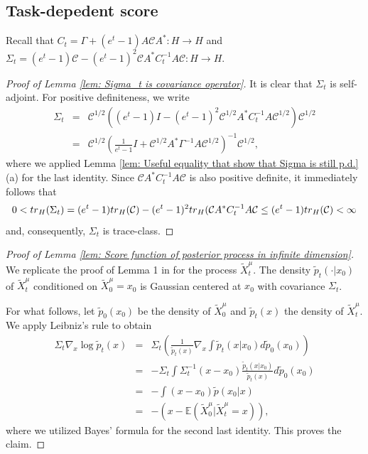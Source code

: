 \documentclass[10pt]{article} %
\newcommand{\E}{\mathbb{E}}
\theoremstyle{plain}
\theoremstyle{definition}
\theoremstyle{remark}
\newcommand{\tr}{{\rm tr}}
\newcommand{\C}{\mathcal C}
\begin{document}
\subsection{Task-depedent score} %

Recall that $C_t = \Gamma + (e^t -1 ) A \C A^* : H\to H$ and $\Sigma_t = (e^t -1)\C - (e^t-1)^2\C A^* C_t^{-1} A \C : H\to H$.

\begin{proof}[Proof of Lemma \ref{lem: Sigma_t is covariance operator}]
It is clear that $\Sigma_t$ is self-adjoint. For positive definiteness, we write
    \begin{eqnarray*}
        \Sigma_t 
        &=& \C^{1/2} \left((e^t-1)I - (e^t-1)^2  \C^{1/2} A^* C_t^{-1}A \C^{1/2}\right)  \C^{1/2} \\
        & = & \C^{1/2} \left( \frac{1}{e^t-1}I + \C^{1/2}A^* \Gamma^{-1}A \C^{1/2}\right)^{-1} \C^{1/2},
    \end{eqnarray*}
where we applied Lemma \ref{lem: Useful equality that show that Sigma is still p.d.} (a) for the last identity.
Since $\C A^* C_t^{-1} A \C$ is also positive definite, it immediately follows that
\begin{equation*}
    0<\tr_H(\Sigma_t) = (e^t-1) \tr_H(\C) - (e^t-1)^2 \tr_H(\C A^* C_t^{-1} A \C \leq (e^t-1) \tr_H(\C) < \infty
\end{equation*}
and, consequently, $\Sigma_t$ is trace-class.
\end{proof}

\begin{proof}[Proof of Lemma \ref{lem: Score function of posterior process in infinite dimension}] 
We replicate the proof of Lemma 1 in \citet{pidstrigach2023infinitedimensional} for the process $\widetilde{X}^{\mu}_t$.
The density $\tilde p_t(\cdot |x_0)$ of $\widetilde{X}^{\mu}_t $ conditioned on $\widetilde{X}^{\mu}_0 = x_0$ is Gaussian centered at $x_0$ with covariance $\Sigma_t$. 

For what follows, let $\tilde{p}_0(x_0)$ be the density of $\widetilde{X}_0^{\mu}$ and $\tilde p_t(x)$ the density of $\widetilde{X}^{\mu}_t$.
We apply Leibniz's rule to obtain
\begin{eqnarray*}
    \Sigma_t \nabla_x \log \tilde p_t(x) 
    &=&  \Sigma_t \left(\frac{1}{\tilde p_t(x)} \nabla_x \int \tilde p_t(x|x_0) d \tilde p_0(x_0)\right) \\
    & = &-\Sigma_t  \int \Sigma_t^{-1}(x-x_0) \frac{\tilde p_t(x| x_0)}{\tilde p_t(x)} d \tilde p_0(x_0) \\
    & = & - \int (x-x_0) \tilde p(x_0 |x) \\
    & = &
    - \left(x - \E(\widetilde{X}^{\mu}_0 |\widetilde{X}^{\mu}_t = x)\right), 
\end{eqnarray*}
where we utilized Bayes' formula for the second last identity.
This proves the claim.
\end{proof}
\end{document}
